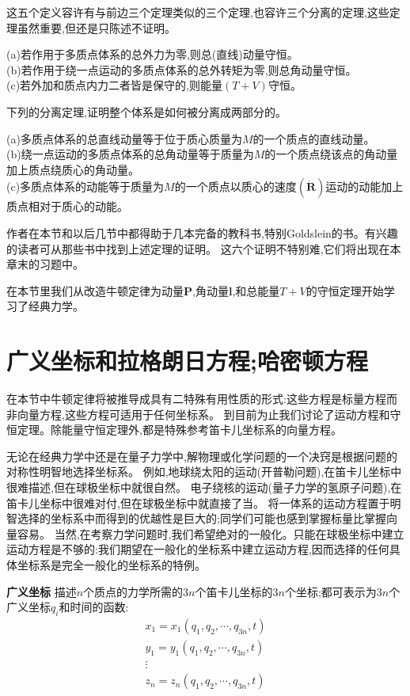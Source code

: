 这五个定义容许有与前边三个定理类似的三个定理,也容许三个分离的定理,这些定理虽然重要,但还是只陈述不证明。
\begin{theorem}
    (a)若作用于多质点体系的总外力为零,则总(直线)动量守恒。\\
    (b)若作用于绕一点运动的多质点体系的总外转矩为零,则总角动量守恒。\\
    (c)若外加和质点内力二者皆是保守的,则能量$(T+V)$守恒。
\end{theorem}

下列的分离定理,证明整个体系是如何被分离成两部分的。
\begin{theorem}
    (a)多质点体系的总直线动量等于位于质心质量为$M$的一个质点的直线动量。\\
    (b)绕一点运动的多质点体系的总角动量等于质量为$M$的一个质点绕该点的角动量加上质点绕质心的角动量。\\
    (c)多质点体系的动能等于质量为$M$的一个质点以质心的速度$(\dot{\mathbf{R}})$运动的动能加上质点相对于质心的动能。
\end{theorem}

作者在本节和以后几节中都得助于几本完备的教科书,特别Goldslein的书。有兴趣的读者可从那些书中找到上述定理的证明。
这六个证明不特别难,它们将出现在本章末的习题中。

在本节里我们从改造牛顿定律为动量$\mathbf{P}$,角动量$\mathbf{l}$,和总能量$T+V$的守恒定理开始学习了经典力学。

\section{广义坐标和拉格朗日方程;哈密顿方程}
在本节中牛顿定律将被推导成具有二特殊有用性质的形式:这些方程是标量方程而非向量方程,这些方程可适用于任何坐标系。
到目前为止我们讨论了运动方程和守恒定理。除能量守恒定理外,都是特殊参考笛卡儿坐标系的向量方程。

无论在经典力学中还是在量子力学中,解物理或化学问题的一个决窍是根据问题的对称性明智地选择坐标系。
例如,地球绕太阳的运动(开普勒问题),在笛卡儿坐标中很难描述,但在球极坐标中就很自然。
电子绕核的运动(量子力学的氢原子问题),在笛卡儿坐标中很难对付,但在球极坐标中就直接了当。
将一体系的运动方程置于明智选择的坐标系中而得到的优越性是巨大的;同学们可能也感到掌握标量比掌握向量容易。
当然,在考察力学问题时,我们希望绝对的一般化。只能在球极坐标中建立运动方程是不够的:我们期望在一般化的坐标系中建立运动方程,因而选择的任何具体坐标系是完全一般化的坐标系的特例。
\begin{definition}[广义坐标]
    \textbf{广义坐标} \quad 描述$n$个质点的力学所需的$3n$个笛卡儿坐标的$3n$个坐标;都可表示为$3n$个广义坐标$q_i$和时间的函数:
    \[
    \begin{array}{c}
        x_1=x_1(q_1,q_2,\cdots,q_{3n},t) \\
        y_1=y_1(q_1,q_2,\cdots,q_{3n},t) \\
        \vdots \\
        z_n=z_n(q_1,q_2,\cdots,q_{3n},t) 
    \end{array}    
    \tag{4-18}
    \]
\end{definition}

